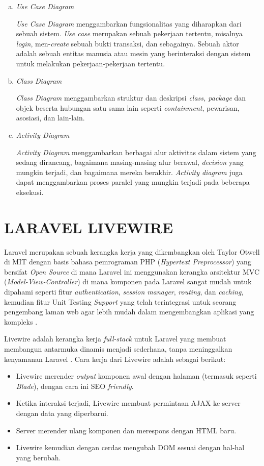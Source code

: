 \begin{enumerate}[a.]
	\item \textit{Use Case Diagram}
	\par \textit{Use Case Diagram} menggambarkan fungsionalitas yang diharapkan dari sebuah sistem. \textit{Use case} merupakan sebuah pekerjaan tertentu, misalnya \textit{login}, men-\textit{create} sebuah bukti transaksi, dan sebagainya. Sebuah aktor adalah sebuah entitas manusia atau mesin yang berinteraksi dengan sistem untuk melakukan pekerjaan-pekerjaan tertentu.
	\item \textit{Class Diagram}
	\par \textit{Class Diagram} menggambarkan struktur dan deskripsi \textit{class, package} dan objek beserta hubungan satu sama lain seperti \textit{containment}, pewarisan, asosiasi, dan lain-lain.
	\item \textit{Activity Diagram}
	\par \textit{Activity Diagram} menggambarkan berbagai alur aktivitas dalam sistem yang sedang dirancang, bagaimana masing-masing alur berawal, \textit{decision} yang mungkin terjadi, dan bagaimana mereka berakhir. \textit{Activity diagram} juga dapat menggambarkan proses paralel yang mungkin terjadi pada beberapa eksekusi.
\end{enumerate}

\section{\uppercase{Laravel Livewire}}
Laravel merupakan sebuah kerangka kerja yang dikembangkan oleh Taylor Otwell di MIT dengan basis bahasa pemrograman PHP (\textit{Hypertext Preprocessor}) yang bersifat \textit{Open Source} di mana Laravel ini menggunakan kerangka arsitektur MVC (\textit{Model-View-Controller}) di mana komponen pada Laravel sangat mudah untuk dipahami seperti fitur \textit{authentication}, \textit{session manager}, \textit{routing}, dan \textit{caching}, kemudian fitur Unit Testing \textit{Support} yang telah terintegrasi untuk seorang pengembang laman web agar lebih mudah dalam mengembangkan aplikasi yang kompleks \citep{sebastian2021perancanagan}.

\par Livewire adalah kerangka kerja \textit{full-stack} untuk Laravel yang membuat membangun antarmuka dinamis menjadi sederhana, tanpa meninggalkan kenyamanan Laravel \citep{livewire2021}. Cara kerja dari Livewire adalah sebagai berikut:

\begin{itemize}
	\item Livewire merender \textit{output} komponen awal dengan halaman (termasuk seperti \textit{Blade}), dengan cara ini SEO \textit{friendly}.
	\item Ketika interaksi terjadi, Livewire membuat permintaan AJAX ke server dengan data yang diperbarui.
	\item Server merender ulang komponen dan merespons dengan HTML baru.
	\item Livewire kemudian dengan cerdas mengubah DOM sesuai dengan hal-hal yang berubah.
\end{itemize}

